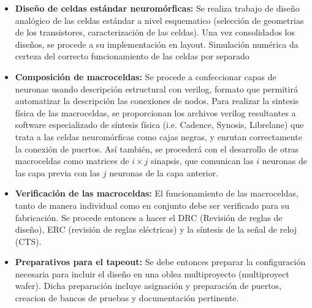 \documentclass[letter, 12pt]{article}
\begin{document}
\begin{itemize}
    \item \textbf{Diseño de celdas estándar neuromórficas:} Se realiza trabajo de diseño analógico de las celdas estándar a nivel esquematico (selección de geometrias de los transistores, caracterización de las celdas). Una vez consolidados los diseños, se procede a su implementación en layout. Simulación numérica da certeza del correcto funcionamiento de las celdas por separado
    \item \textbf{Composición de macroceldas:} Se procede a confeccionar capas de neuronas usando descripción estructural con verilog, formato que permitirá automatizar la descripción las conexiones de nodos. Para realizar la sintesis física de las macroceldas, se proporcionan los archivos verilog resultantes a software especializado de síntesis física (i.e. Cadence, Synosis, Librelane) que trata a las celdas neuromórficas como cajas negras, y enrutan correctamente la conexión de puertos. Así también, se procederá con el desarrollo de otras macroceldas como matrices de $i\times j$ sinapsis, que comunican las $i$ neuronas de las capa previa con las $j$ neuronas de la capa anterior. 
    \item \textbf{Verificación de las macroceldas:} El funcionamiento de las macroceldas, tanto de manera individual como en conjunto debe ser verificado para su fabricación. Se procede entonces a hacer el DRC (Revisión de reglas de diseño), ERC (revisión de reglas eléctricas) y la síntesis de la señal de reloj (CTS). 
     \item \textbf{Preparativos para el tapeout:} Se debe entonces preparar la configuración necesaria para incluir el diseño en una oblea multiproyecto (multiproyect wafer). Dicha preparación incluye asignación y preparación de puertos, creacion de bancos de pruebas y documentación pertinente. 
\end{itemize}
\end{document}
